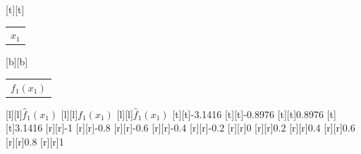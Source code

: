 %    
%
%
\begin{psfrags}%
\psfragscanon%
%
[t][t]{\setlength{\tabcolsep}{0pt}\begin{tabular}{c}$x_1$\end{tabular}}%
[b][b]{\setlength{\tabcolsep}{0pt}\begin{tabular}{c}$f_1(x_1)$\end{tabular}}%
[l][l]{$\hat f_1(x_1)$}%
[l][l]{$f_1(x_1)$}%
[l][l]{$\hat f_1(x_1)$}%
%
[t][t]{-3.1416}%
[t][t]{-0.8976}%
[t][t]{0.8976}%
[t][t]{3.1416}%
%
[r][r]{-1}%
[r][r]{-0.8}%
[r][r]{-0.6}%
[r][r]{-0.4}%
[r][r]{-0.2}%
[r][r]{0}%
[r][r]{0.2}%
[r][r]{0.4}%
[r][r]{0.6}%
[r][r]{0.8}%
[r][r]{1}%
%
%
\end{psfrags}%
%
